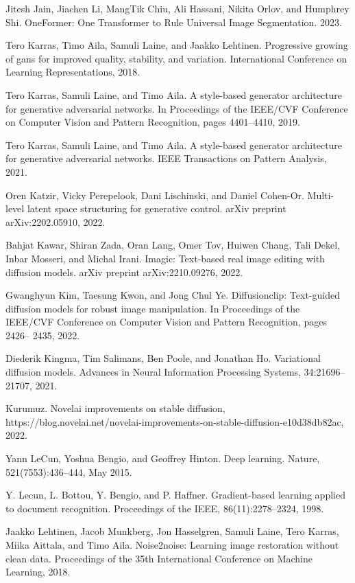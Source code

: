 \documentclass[a4paper,AutoFakeBold,oneside,12pt]{book}
\begin{document}
\begin{nopagenumber}
\noindent
[35] Jitesh Jain, Jiachen Li, MangTik Chiu, Ali Hassani, Nikita Orlov, and Humphrey Shi. OneFormer: One Transformer to Rule Universal Image Segmentation. 2023.

\noindent
[36] Tero Karras, Timo Aila, Samuli Laine, and Jaakko Lehtinen. Progressive growing of gans for improved quality, stability, and variation. International Conference on Learning Representations, 2018.

\noindent
[37] Tero Karras, Samuli Laine, and Timo Aila. A style-based generator architecture for generative adversarial networks. In Proceedings of the IEEE/CVF Conference on Computer Vision and Pattern Recognition, pages 4401–4410, 2019.

\noindent
[38] Tero Karras, Samuli Laine, and Timo Aila. A style-based generator architecture for generative adversarial networks. IEEE Transactions on Pattern Analysis, 2021.

\noindent
[39] Oren Katzir, Vicky Perepelook, Dani Lischinski, and Daniel Cohen-Or. Multi-level latent space structuring for generative control. arXiv preprint arXiv:2202.05910, 2022.

\noindent
[40] Bahjat Kawar, Shiran Zada, Oran Lang, Omer Tov, Huiwen Chang, Tali Dekel, Inbar Mosseri, and Michal Irani. Imagic: Text-based real image editing with diffusion models. arXiv preprint arXiv:2210.09276, 2022.

\noindent
[41] Gwanghyun Kim, Taesung Kwon, and Jong Chul Ye. Diffusionclip: Text-guided diffusion models for robust image manipulation. In Proceedings of the IEEE/CVF Conference on Computer Vision and Pattern Recognition, pages 2426– 2435, 2022.

\noindent
[42] Diederik Kingma, Tim Salimans, Ben Poole, and Jonathan Ho. Variational diffusion models. Advances in Neural Information Processing Systems, 34:21696–21707, 2021.

\noindent
[43] Kurumuz. Novelai improvements on stable diffusion, https://blog.novelai.net/novelai-improvements-on-stable-diffusion-e10d38db82ac, 2022.

\noindent
[44] Yann LeCun, Yoshua Bengio, and Geoffrey Hinton. Deep learning. Nature, 521(7553):436–444, May 2015.

\noindent
[45] Y. Lecun, L. Bottou, Y. Bengio, and P. Haffner. Gradient-based learning applied to document recognition. Proceedings of the IEEE, 86(11):2278–2324, 1998.

\noindent
[46] Jaakko Lehtinen, Jacob Munkberg, Jon Hasselgren, Samuli Laine, Tero Karras, Miika Aittala, and Timo Aila. Noise2noise: Learning image restoration without clean data. Proceedings of the 35th International Conference on Machine Learning, 2018.


\end{nopagenumber}
\end{document}
